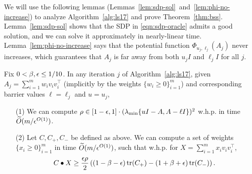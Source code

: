 We will use the following lemmas (Lemmas~\ref{lem:sdp-sol}~and~\ref{lem:phi-no-increase}) to analyze Algorithm~\ref{alg:ls17} and prove Theorem~\ref{thm:bss}.
Lemma~\ref{lem:sdp-sol} shows that the SDP in \eqref{eqn:sdp-oracle} admits a good solution, and we can solve it approximately in nearly-linear time.
Lemma~\ref{lem:phi-no-increase} says that the potential function $\Phi_{u_j,\ell_j}(A_j)$ never increases, which guarantees that $A_j$ is far away from both $u_j I$ and $\ell_j I$ for all $j$.


\begin{lemma}
\label{lem:sdp-sol}
Fix $0 < \beta,\epsilon \le 1/10$.
In any iteration $j$ of Algorithm~\ref{alg:ls17}, given $A_j = \sum_{i=1}^m w_i v_i v_i^\top$ (implicitly by the weights $\{w_i \ge 0\}_{i=1}^m$) and corresponding barrier values $\ell = \ell_j$ and $u = u_j$,
\begin{enumerate}
\item[(1)] We can compute $\rho \in [1-\epsilon, 1] \cdot (\lambda_{\min}\{u I - A, A - \ell I\})^2$ w.h.p. in time $\widetilde O(m / \epsilon^{O(1)})$.
\item[(2)] Let $C, C_{+}, C_{-}$ be defined as above. %
We can compute a set of weights $\{x_i \ge 0\}_{i=1}^m$ in time $\widetilde O(m / \epsilon^{O(1)})$, such that w.h.p. for $X = \sum_{i=1}^m x_i v_i v_i^\top$,
\[
C \bullet X \ge \frac{\epsilon \rho}{2} \left((1-\beta-\epsilon)\operatorname{tr}(C_+) - (1+\beta+\epsilon)\operatorname{tr}(C_-)\right).
\]
\end{enumerate} 

\end{lemma}

